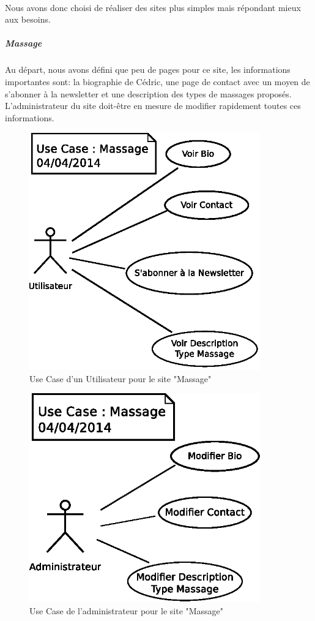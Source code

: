 \documentclass[11pt,a4paper,twoside]{report}
\begin{document}
				\paragraph*{}Nous avons donc choisi de réaliser des sites plus simples mais répondant mieux aux besoins.
					\subparagraph*{Massage}Au départ, nous avons défini que peu de pages pour ce site, les informations importantes sont: la biographie de Cédric, une page de contact avec un moyen de s'abonner à la newsletter et une description des types de massages proposés. L'administrateur du site doit-être en mesure de modifier rapidement toutes ces informations.
						\begin{figure}[H]
							\centering
							\includegraphics[width=10cm]{UseCase-Massage-User.eps}
							\caption[Use Case Utilisateur Massage]{Use Case d'un Utilisateur pour le site "Massage"}
							\label{fig:UseCase-Massage User}
						\end{figure}
						\begin{figure}[H]
							\centering
							\includegraphics[width=10cm]{UseCase-Massage-Administrateur.eps}
							\caption[Use Case Administrateur Massage]{Use Case de l'administrateur pour le site "Massage"}
							\label{fig:UseCase-Massage Admin}
						\end{figure}\newpage
\end{document}
